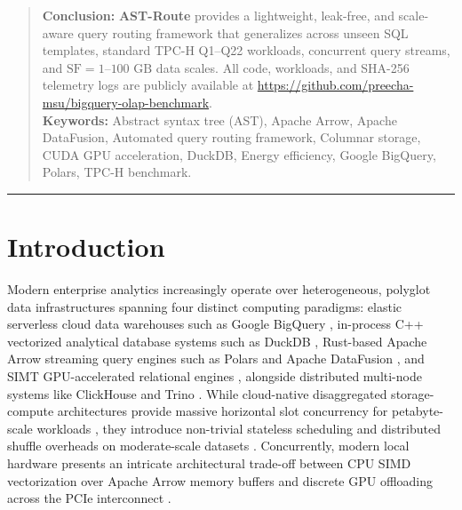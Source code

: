 \documentclass[10pt,a4paper]{article}
\begin{document}
\begin{quote}
\textbf{Conclusion:} \textbf{AST-Route} provides a lightweight, leak-free, and scale-aware query routing framework that generalizes across unseen SQL templates, standard TPC-H Q1--Q22 workloads, concurrent query streams, and $\text{SF}=1\text{--}100\text{ GB}$ data scales. All code, workloads, and SHA-256 telemetry logs are publicly available at \url{https://github.com/preecha-msu/bigquery-olap-benchmark}.\\[0.45em]
\textbf{\color{springerblue}Keywords:} Abstract syntax tree (AST), Apache Arrow, Apache DataFusion, Automated query routing framework, Columnar storage, CUDA GPU acceleration, DuckDB, Energy efficiency, Google BigQuery, Polars, TPC-H benchmark.
\end{quote}
\noindent\rule{\textwidth}{0.8pt}

\section{Introduction}
Modern enterprise analytics increasingly operate over heterogeneous, polyglot data infrastructures spanning four distinct computing paradigms: elastic serverless cloud data warehouses such as Google BigQuery \cite{melnik2010dremel,melnik2020dremel,lounissi2025funda}, in-process C++ vectorized analytical database systems such as DuckDB \cite{raasveldt2019duckdb,kuiper2024duckdb_ooc}, Rust-based Apache Arrow streaming query engines such as Polars and Apache DataFusion \cite{lamb2024datafusion}, and SIMT GPU-accelerated relational engines \cite{chrysogelos2019hetexchange,shanbhag2020crystal}, alongside distributed multi-node systems like ClickHouse \cite{schulze2024clickhouse} and Trino \cite{sethi2019presto}. While cloud-native disaggregated storage-compute architectures provide massive horizontal slot concurrency for petabyte-scale workloads \cite{shojaee2024serverless,abdalla2022bigdata}, they introduce non-trivial stateless scheduling and distributed shuffle overheads on moderate-scale datasets \cite{begoli2018calcite,garcia2008database,lounissi2025funda}. Concurrently, modern local hardware presents an intricate architectural trade-off between CPU SIMD vectorization over Apache Arrow memory buffers and discrete GPU offloading across the PCIe interconnect \cite{milicevic2024dlquery,root2019mapd,kim2022blazingsql}.
\end{document}
